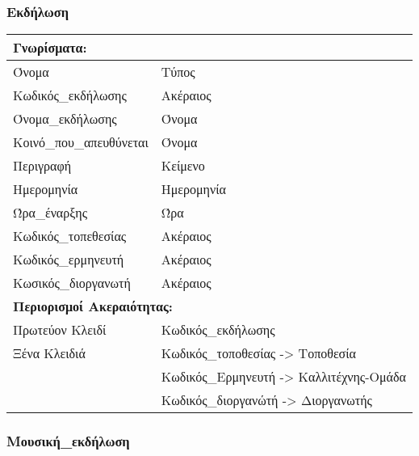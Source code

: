 \subsubsection*{Εκδήλωση}

\begin{tabular}{|p{6cm}|p{8cm}|}
  \multicolumn{2}{l}{\textbf{Γνωρίσματα:}}                         \\ \hline
  Όνομα                   & Τύπος                                  \\ \hline
  Κωδικός\_εκδήλωσης      & Ακέραιος                               \\ \hline
  Όνομα\_εκδήλωσης        & Όνομα                                  \\ \hline
  Κοινό\_που\_απευθύνεται & Όνομα                                  \\ \hline
  Περιγραφή               & Κείμενο                                \\ \hline
  Ημερομηνία              & Ημερομηνία                             \\ \hline
  Ώρα\_έναρξης            & Ώρα                                    \\ \hline
  Κωδικός\_τοπεθεσίας     & Ακέραιος                               \\ \hline
  Κωδικός\_ερμηνευτή      & Ακέραιος                               \\ \hline
  Κωσικός\_διοργανωτή     & Ακέραιος                               \\ \hline
  \multicolumn{2}{l}{\textbf{Περιορισμοί Ακεραιότητας:}}           \\ \hline
  Πρωτεύον Κλειδί         & Κωδικός\_εκδήλωσης                     \\ \hline
  Ξένα Κλειδιά            & Κωδικός\_τοποθεσίας -> Τοποθεσία       \\ \cline{2-2}
                          & Κωδικός\_Ερμηνευτή -> Καλλιτέχνης-Ομάδα \\ \cline{2-2}
                          & Κωδικός\_διοργανώτή -> Διοργανωτής     \\ \hline
\end{tabular}

\subsubsection*{Μουσική\_εκδήλωση}

